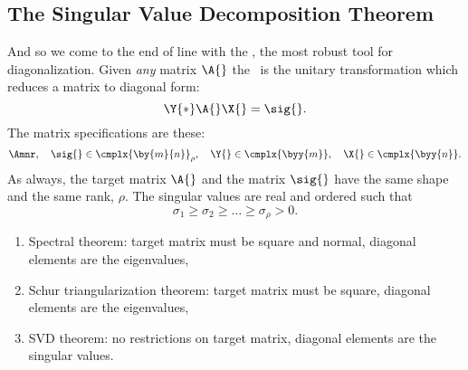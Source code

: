 \subsection{The Singular Value Decomposition Theorem}
And so we come to the end of line with the \svdl, the most robust tool for diagonalization. Given \emph{any} matrix $\A{}$ the \svdl \ is the unitary transformation which reduces a matrix to diagonal form:
\begin{equation}
  \Y{*}\A{}\X{} = \sig{}.
\end{equation}
The matrix specifications are these:
\begin{equation*}
  \Amnr, \quad \sig{}\in\cmplx{\by{m}{n}}_{\rho}, \quad \Y{}\in\cmplx{\byy{m}}, \quad \X{}\in\cmplx{\byy{n}}.
\end{equation*}
As always, the target matrix $\A{}$ and the matrix $\sig{}$ have the same shape and the same rank, $\rho$. The singular values are real and ordered such that
\begin{equation*}
  \sigma_{1} \ge \sigma_{2} \ge \dots \ge \sigma_{\rho} > 0.
\end{equation*}

\begin{enumerate}
\item Spectral theorem:
\subitem target matrix must be square and normal,
\subitem diagonal elements are the eigenvalues,
\item Schur triangularization theorem:
\subitem target matrix must be square,
\subitem diagonal elements are the eigenvalues,
\item SVD theorem:
\subitem no restrictions on target matrix,
\subitem diagonal elements are the singular values.
\end{enumerate}

\endinput
